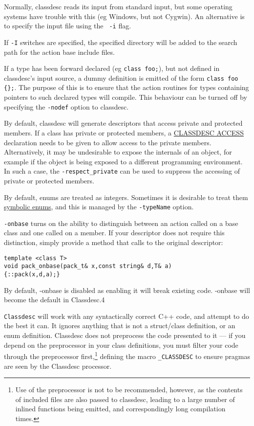 Normally, classdesc reads its input from standard input, but some
operating systems have trouble with this (eg Windows, but not
Cygwin). An alternative is to specify the input file using the {\tt
  -i} flag.

If {\tt -I} switches are specified, the specified directory will be
added to the search path for the action base include files.

If a type has been forward declared (eg \verb+class foo;+), but not
defined in classdesc's input source, a dummy definition is emitted of
the form \verb+class foo {};+. The purpose of this is to ensure that
the action routines for types containing pointers to such declared
types will compile. This behaviour can be turned off by specifying the
\verb+-nodef+ option to classdesc.

By default, classdesc will generate descriptors that access private
and protected members. If a class has private or protected members, a
\hyperref{{\tt CLASSDESC\_ACCESS}}{ (see
  \S}{)}{CLASSDESC ACCESS} declaration needs
to be given to allow access to the private members. Alternatively, it
may be undesirable to expose the internals of an object, for example
if the object is being exposed to a different programming
environment. In such a case, the
\verb+-respect_private+ can be used to
suppress the accessing of private or protected members.

By default, enums are treated as integers. Sometimes it is desirable
to treat them \hyperref{symbolically}{ (see \S}{)}{symbolic enums}, and
this is managed by the \verb+-typeName+ option.

\verb+-onbase+ turns on the ability to distinguish between an action
called on a base class and one called on a member. If your descriptor
does not require this distinction, simply provide a method that calls
to the original descriptor:
\begin{verbatim}
template <class T>
void pack_onbase(pack_t& x,const string& d,T& a)
{::pack(x,d,a);}
\end{verbatim} 
By default, -onbase is disabled as enabling it will break existing
code. -onbase will become the default in Classdesc.4


{\tt Classdesc} will work with any syntactically correct C++ code, and
attempt to do the best it can. It ignores anything that is not a
struct/class definition, or an enum definition. Classdesc
does not preprocess the code presented to it --- if you depend on the
preprocessor in your class definitions, you must filter your code
through the preprocessor first,\footnote{Use of
the preprocessor is not to be recommended, however, as the contents of
included files are also passed to classdesc, leading to a large number
of inlined functions being emitted, and correspondingly long
compilation times.} defining the macro
\verb+_CLASSDESC+ to ensure pragmas are seen by the
Classdesc processor.

